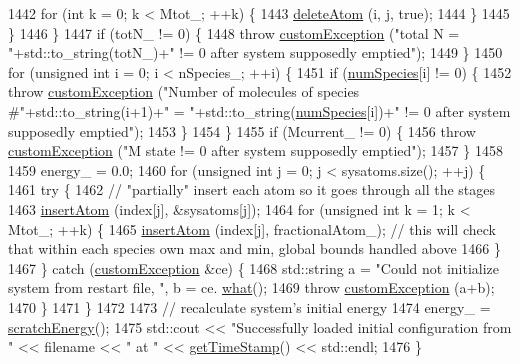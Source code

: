 \begin{DoxyCode}
1442             \textcolor{keywordflow}{for} (\textcolor{keywordtype}{int} k = 0; k < Mtot\_; ++k) \{
1443                 \hyperlink{classsim_system_acabf4fc5b5b90bba62e1449ddb3646c6}{deleteAtom} (i, j, \textcolor{keyword}{true});
1444             \}
1445         \}
1446     \}
1447     \textcolor{keywordflow}{if} (totN\_ != 0) \{
1448         \textcolor{keywordflow}{throw} \hyperlink{classcustom_exception}{customException} (\textcolor{stringliteral}{"total N = "}+std::to\_string(totN\_)+\textcolor{stringliteral}{" != 0 after system
       supposedly emptied"});
1449     \}
1450     \textcolor{keywordflow}{for} (\textcolor{keywordtype}{unsigned} \textcolor{keywordtype}{int} i = 0; i < nSpecies\_; ++i) \{
1451         \textcolor{keywordflow}{if} (\hyperlink{classsim_system_a9eea865e6dc1cff377b1e79c4d9c23f0}{numSpecies}[i] != 0) \{
1452             \textcolor{keywordflow}{throw} \hyperlink{classcustom_exception}{customException} (\textcolor{stringliteral}{"Number of molecules of species #"}+std::to\_string(i+1)+\textcolor{stringliteral}{"
       = "}+std::to\_string(\hyperlink{classsim_system_a9eea865e6dc1cff377b1e79c4d9c23f0}{numSpecies}[i])+\textcolor{stringliteral}{" != 0 after system supposedly emptied"});
1453         \}
1454     \}
1455     \textcolor{keywordflow}{if} (Mcurrent\_ != 0) \{
1456         \textcolor{keywordflow}{throw} \hyperlink{classcustom_exception}{customException} (\textcolor{stringliteral}{"M state != 0 after system supposedly emptied"});
1457     \}
1458 
1459     energy\_ = 0.0;
1460     \textcolor{keywordflow}{for} (\textcolor{keywordtype}{unsigned} \textcolor{keywordtype}{int} j = 0; j < sysatoms.size(); ++j) \{
1461         \textcolor{keywordflow}{try} \{
1462             \textcolor{comment}{// "partially" insert each atom so it goes through all the stages}
1463             \hyperlink{classsim_system_a0404e9435cc046d19b6bb990678ee069}{insertAtom} (index[j], &sysatoms[j]);
1464             \textcolor{keywordflow}{for} (\textcolor{keywordtype}{unsigned} \textcolor{keywordtype}{int} k = 1; k < Mtot\_; ++k) \{
1465                 \hyperlink{classsim_system_a0404e9435cc046d19b6bb990678ee069}{insertAtom} (index[j], fractionalAtom\_); \textcolor{comment}{// this will check that within each
       species own max and min, global bounds handled above}
1466             \}
1467         \} \textcolor{keywordflow}{catch} (\hyperlink{classcustom_exception}{customException} &ce) \{
1468             std::string a = \textcolor{stringliteral}{"Could not initialize system from restart file, "}, b = ce.
      \hyperlink{classcustom_exception_aeb6ab5848b038adfc68fde86a512f691}{what}();
1469             \textcolor{keywordflow}{throw} \hyperlink{classcustom_exception}{customException} (a+b);
1470         \}
1471     \}
1472 
1473     \textcolor{comment}{// recalculate system's initial energy}
1474     energy\_ = \hyperlink{classsim_system_a51539ed4c3bb4905b32ce428c1c537fe}{scratchEnergy}();
1475     std::cout << \textcolor{stringliteral}{"Successfully loaded initial configuration from "} << filename << \textcolor{stringliteral}{" at "} << 
      \hyperlink{utilities_8cpp_aa6d910bf51f18a75deb20c6f0fbba285}{getTimeStamp}() << std::endl;
1476 \}
\end{DoxyCode}
